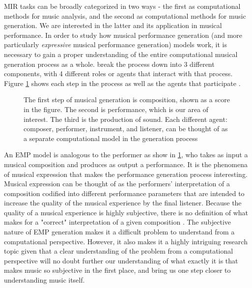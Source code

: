 MIR tasks can be broadly categorized in two ways - the first as computational methods for music analysis, and the second as computational methods for music generation. We are interested in the latter and its application in musical performance. In order to study how musical performance generation (and more particularly \emph{expressive} musical performance generation) models work, it is necessary to gain a proper understanding of the entire computational musical generation process as a whole. \citet{ji2020comprehensive} break the process down into 3 different components, with 4 different roles or agents that interact with that process. Figure \ref{fig:generation_process} shows each step in the process as well as the agents that participate . 

\begin{figure}
    \centering
    \caption{The first step of musical generation is composition, shown as a score in the figure. The second is performance, which is our area of interest. The third is the production of sound. Each different agent: composer, performer, instrument, and listener, can be thought of as a separate computational model in the generation process}
    \label{fig:generation_process}
\end{figure}

An EMP model is analogous to the performer as show in \ref{fig:generation_process}, who takes as input a musical composition and produces as output a performance. It is the phenomena of musical expression that makes the performance generation process interesting. Musical expression can be thought of as the performers' interpretation of a composition codified into different performance parameters that are intended to increase the quality of the musical experience by the final listener. Because the quality of a musical experience is highly subjective, there is no definition of what makes for a "correct" interpretation of a given composition \cite{cancino2018computational}. The subjective nature of EMP generation makes it a difficult problem to understand from a computational perspective. However, it also makes it a highly intriguing research topic given that a clear understanding of the problem from a computational perspective will no doubt further our understanding of what exactly it is that makes music so subjective in the first place, and bring us one step closer to understanding music itself. 

